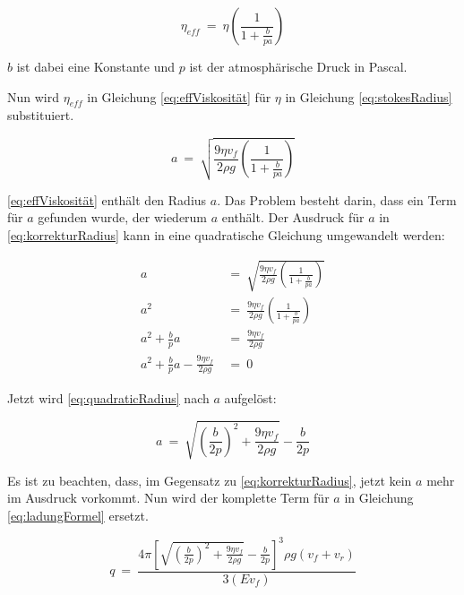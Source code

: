 \begin{equation}\label{eq:effViskosität}
	\eta_{eff} \ = \ \eta \left( \frac{1}{1 + \frac{b}{pa}} \right) 
\end{equation}

\noindent $b$ ist dabei eine Konstante und $p$ ist der atmosphärische Druck in Pascal. 

\noindent Nun wird $\eta_{eff}$ in Gleichung \ref{eq:effViskosität} für $\eta$ in Gleichung \ref{eq:stokesRadius} substituiert.

\begin{equation}\label{eq:korrekturRadius}
	a \ = \ \sqrt{\frac{9\eta v_f}{2\rho g} \left( \frac{1}{1 + \frac{b}{pa}}\right)}
\end{equation}

\noindent \autoref{eq:effViskosität} enthält den Radius $a$. Das Problem besteht darin, dass ein Term für $a$ gefunden wurde, der wiederum $a$ enthält. Der Ausdruck für $a$ in \autoref{eq:korrekturRadius} kann in eine quadratische Gleichung umgewandelt werden:

\begin{equation}\label{eq:quadraticRadius}
	\begin{split}
		a & \ = \ \sqrt{\frac{9\eta v_f}{2\rho g} \left( \frac{1}{1 + \frac{b}{pa}}\right)} \\
		a^2 & \ = \ \frac{9\eta v_f}{2\rho g} \left( \frac{1}{1 + \frac{b}{pa}}\right) \\
		a^2 + \frac{b}{p}a & \ = \ \frac{9\eta v_f}{2\rho g} \\
		a^2 + \frac{b}{p}a - \frac{9\eta v_f}{2\rho g} & \ = \ 0
	\end{split}
\end{equation} 

\noindent Jetzt wird \autoref{eq:quadraticRadius} nach $a$ aufgelöst:

\begin{equation}\label{eq:qRadius}
	a \ = \ \sqrt{\left( \frac{b}{2p}\right)^2 + \frac{9\eta v_f}{2\rho g}} - \frac{b}{2p}
\end{equation}

\noindent Es ist zu beachten, dass, im Gegensatz zu \autoref{eq:korrekturRadius}, jetzt kein $a$ mehr im Ausdruck vorkommt. Nun wird der komplette Term für $a$ in Gleichung \ref{eq:ladungFormel} ersetzt.

\begin{equation}\label{eq:ladungMitEingesetzR}
	q \ = \ \frac{4\pi \left[ \sqrt{\left( \frac{b}{2p}\right)^2 + \frac{9\eta v_f}{2\rho g}} - \frac{b}{2p} \right]^3 \rho g(v_f + v_r) }{3(Ev_f)}
\end{equation}

